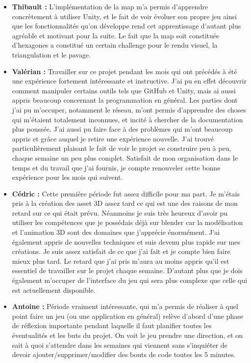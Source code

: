 \documentclass[12pt]{report}
\begin{document}
\begin{itemize}
	\item \textbf{Thibault :} L’implémentation de la map m’a permis d’apprendre concrètement à utiliser Unity, et le fait de voir évoluer son propre jeu ainsi que les fonctionnalités qu’on développe rend cet apprentissage d’autant plus agréable et motivant pour la suite. Le fait que la map soit constituée d’hexagones a constitué un certain challenge pour le rendu visuel, la triangulation et le pavage.
	\item \textbf{Valérian :} Travailler sur ce projet pendant les mois qui ont précédés à été une expérience fortement intéressante et instructive. J’ai pu en effet découvrir comment manipuler certains outils tels que GitHub et Unity, mais ai aussi appris beaucoup concernant la programmation en général. Les parties dont j’ai pu m’occuper, notamment le réseau, m’ont permis d’apprendre des choses qui m'étaient totalement inconnues, et incité à chercher de la documentation plus poussée. J’ai aussi pu faire face à des problèmes qui m’ont beaucoup appris et grâce auquel je retire une expérience nouvelle. J’ai trouvé particulièrement plaisant le fait de voir le projet se construire peu à peu, chaque semaine un peu plus complet. Satisfait de mon organisation dans le temps et du travail que j’ai fournis, je compte renouveler cette bonne expérience pour les mois qui suivent.
	\item \textbf{Cédric :} Cette première période fut assez difficile pour ma part. Je m’étais pris à la création des asset 3D assez tard ce qui est une des raisons de mon retard sur ce qui était prévu. Néanmoins je suis très heureux d’avoir pu utiliser les compétences que je possédais déjà sur blender car la modélisation et l’animation 3D sont des domaines que j’apprécie énormément. J’ai également appris de nouvelles techniques et suis devenu plus rapide sur mes créations. Je suis assez satisfait de ce que j’ai fait et je compte bien faire mieux plus tard. Le retard que j’ai pris m’aura au moins appris qu’il est essentiel de travailler sur le projet chaque semaine. D’autant plus que je dois également m’occuper de l’interface du jeu qui sera plus complexe que celle qui est actuellement disponible.
	\item \textbf{Antoine :} Période vraiment intéressante, qui m’a permis de réaliser à quel point faire un jeu (ou une application en général) relève d’abord d’une phase de réflexion importante pendant laquelle il faut planifier toutes les éventualités et les buts du projet. On voit le jeu prendre une direction, et on sait à quoi s’attendre dans les semaines qui viennent sans s’inquiéter de devoir ajouter/supprimer/modifier des bouts de code toutes les 5 minutes.
\end{itemize}
\end{document}
